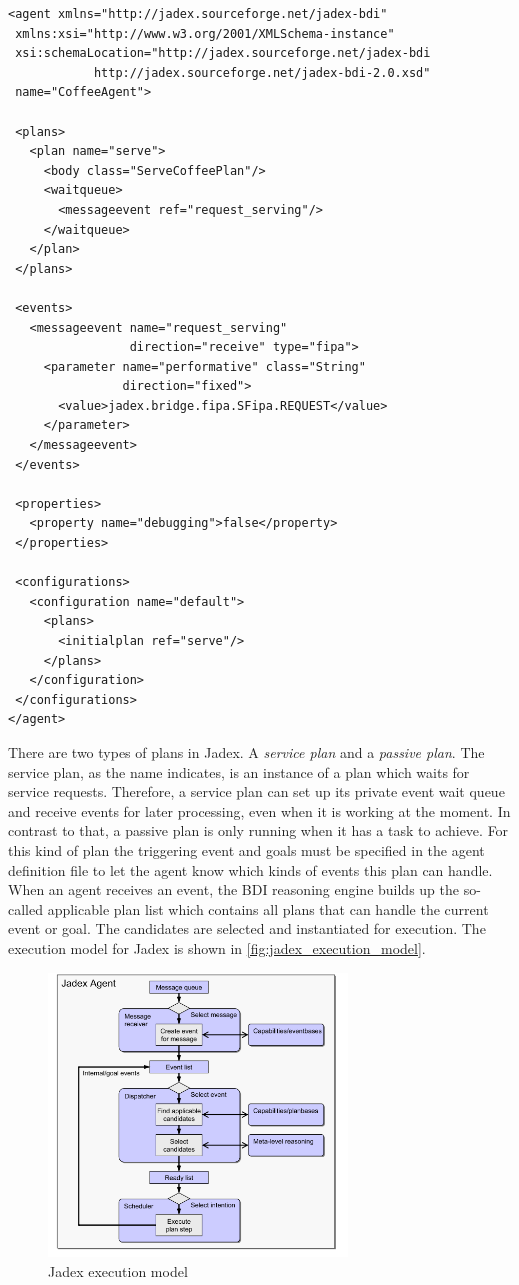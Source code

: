 \begin{lstlisting}[caption={Jadex XML file.}, label=lst:jadex_xml]
<agent xmlns="http://jadex.sourceforge.net/jadex-bdi"
 xmlns:xsi="http://www.w3.org/2001/XMLSchema-instance"
 xsi:schemaLocation="http://jadex.sourceforge.net/jadex-bdi
            http://jadex.sourceforge.net/jadex-bdi-2.0.xsd"
 name="CoffeeAgent">

 <plans>
   <plan name="serve">
     <body class="ServeCoffeePlan"/>
     <waitqueue>
       <messageevent ref="request_serving"/>
     </waitqueue>
   </plan>
 </plans>

 <events>
   <messageevent name="request_serving"
                 direction="receive" type="fipa">
     <parameter name="performative" class="String"
                direction="fixed">
       <value>jadex.bridge.fipa.SFipa.REQUEST</value>
     </parameter>
   </messageevent>
 </events>

 <properties>
   <property name="debugging">false</property>
 </properties>

 <configurations>
   <configuration name="default">
     <plans>
       <initialplan ref="serve"/>
     </plans>
   </configuration>
 </configurations>
</agent>
\end{lstlisting}

There are two types of plans in Jadex.
A \emph{service plan} and a \emph{passive plan}.
The service plan, as the name indicates, is an instance of a plan which waits for service requests.
Therefore, a service plan can set up its private event wait queue and receive events for later processing, even when it is working at the moment.
In contrast to that, a passive plan is only running when it has a task to achieve.
For this kind of plan the triggering event and goals must be specified in the agent definition file to let the agent know which kinds of events this plan can handle.
When an agent receives an event, the BDI reasoning engine builds up the so-called applicable plan list which contains all plans that can handle the current event or goal.
The candidates are selected and instantiated for execution.
The execution model for Jadex is shown in \autoref{fig:jadex_execution_model}.
\begin{figure}
	\centering
	\includegraphics[width=300px]{images/Jadex_execution_model.png}
	\caption{Jadex execution model \cite{pokahr_jadex_2005}}
	\label{fig:jadex_execution_model}
\end{figure}


